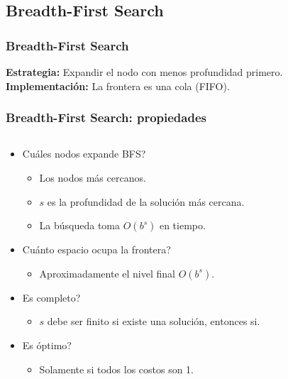 \documentclass[10pt]{beamer}
\begin{document}
\subsection{Breadth-First Search}

\begin{frame}
  \frametitle{Breadth-First Search}

  \textbf{Estrategia:} Expandir el nodo con menos \alert{profundidad} primero.
  \textbf{Implementación:} La frontera es una \alert{cola} (FIFO).

\end{frame}

\begin{frame}
  \frametitle{Breadth-First Search: propiedades}
  \begin{columns}
    \begin{column}{0.5\textwidth}
      \begin{itemize}
        \item Cuáles nodos expande BFS?
          \begin{itemize}
            \item Los nodos más cercanos.
            \item $s$ es la profundidad de la solución más cercana.
            \item La búsqueda toma $O(b^s)$ en tiempo.
          \end{itemize}
        \item Cuánto espacio ocupa la frontera?
          \begin{itemize}
            \item Aproximadamente el nivel final $O(b^s)$.
          \end{itemize}
        \item Es completo?
          \begin{itemize}
            \item $s$ debe ser finito si existe una solución, entonces si.
          \end{itemize}
        \item Es óptimo?
          \begin{itemize}
            \item Solamente si todos los costos son 1.
          \end{itemize}
      \end{itemize}
    \end{column}
    \begin{column}{0.5\textwidth}
      \begin{figure}[!h] 

\end{figure}
\end{column}
\end{columns}
\end{frame}
\end{document}

